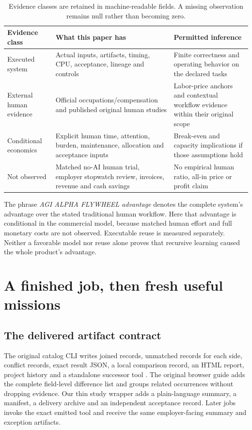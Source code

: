 \documentclass[11pt,a4paper]{article}
\newcommand{\smalltable}{\small\setlength{\tabcolsep}{5pt}}
\begin{document}
\begin{table}[H]\centering\smalltable
\begin{tabularx}{\linewidth}{P{.18\linewidth}YY}
\toprule
Evidence class & What this paper has & Permitted inference\\
\midrule
Executed system & Actual inputs, artifacts, timing, CPU, acceptance, lineage and controls & Finite correctness and operating behavior on the declared tasks\\
External human evidence & Official occupations/compensation and published original human studies & Labor-price anchors and contextual workflow evidence within their original scope\\
Conditional economics & Explicit human time, attention, burden, maintenance, allocation and acceptance inputs & Break-even and capacity implications if those assumptions hold\\
Not observed & Matched no-AI human trial, employer stopwatch review, invoices, revenue and cash savings & No empirical human ratio, all-in price or profit claim\\
\bottomrule
\end{tabularx}
\caption{Evidence classes are retained in machine-readable fields. A missing observation remains null rather than becoming zero.}
\end{table}

The phrase \emph{AGI ALPHA FLYWHEEL advantage} denotes the complete system's advantage over the stated traditional human workflow. Here that advantage is conditional in the commercial model, because matched human effort and full monetary costs are not observed. Executable reuse is measured separately. Neither a favorable model nor reuse alone proves that recursive learning caused the whole product's advantage.

\section{A finished job, then fresh useful missions}

\subsection{The delivered artifact contract}

The original catalog CLI writes joined records, unmatched records for each side, conflict records, exact result JSON, a local comparison record, an HTML report, project history and a standalone successor tool \citep{alpha_catalog_cli}. The original browser guide adds the complete field-level difference list and groups related occurrences without dropping evidence. Our thin study wrapper adds a plain-language summary, a manifest, a delivery archive and an independent acceptance record. Later jobs invoke the exact emitted tool and receive the same employer-facing summary and exception artifacts.
\end{document}
